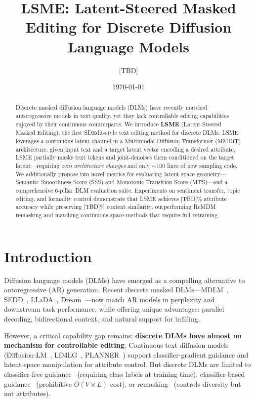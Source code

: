 \documentclass{article}
\title{LSME: Latent-Steered Masked Editing for Discrete Diffusion Language Models}
\author{[TBD]}
\date{\today}
\begin{document}
\maketitle

\begin{abstract}
Discrete masked diffusion language models (DLMs) have recently matched autoregressive models in text quality, yet they lack controllable editing capabilities enjoyed by their continuous counterparts.
We introduce \textbf{LSME} (Latent-Steered Masked Editing), the first SDEdit-style text editing method for discrete DLMs.
LSME leverages a continuous latent channel in a Multimodal Diffusion Transformer (MMDiT) architecture: given input text and a target latent vector encoding a desired attribute, LSME partially masks text tokens and joint-denoises them conditioned on the target latent---requiring \emph{zero architecture changes} and only $\sim$100 lines of new sampling code.
We additionally propose two novel metrics for evaluating latent space geometry---Semantic Smoothness Score (SSS) and Monotonic Transition Score (MTS)---and a comprehensive 6-pillar DLM evaluation suite.
Experiments on sentiment transfer, topic editing, and formality control demonstrate that LSME achieves [TBD]\% attribute accuracy while preserving [TBD]\% content similarity, outperforming ReMDM remasking and matching continuous-space methods that require full retraining.
\end{abstract}

\section{Introduction}

Diffusion language models (DLMs) have emerged as a compelling alternative to autoregressive (AR) generation.
Recent discrete masked DLMs---MDLM~\cite{mdlm2024}, SEDD~\cite{sedd2024}, LLaDA~\cite{llada2025}, Dream~\cite{dream2025}---now match AR models in perplexity and downstream task performance, while offering unique advantages: parallel decoding, bidirectional context, and natural support for infilling.

However, a critical capability gap remains: \textbf{discrete DLMs have almost no mechanism for controllable editing}.
Continuous text diffusion models (Diffusion-LM~\cite{diffusionlm2022}, LD4LG~\cite{ld4lg2023}, PLANNER~\cite{planner2023}) support classifier-gradient guidance and latent-space manipulation for attribute control.
But discrete DLMs are limited to classifier-free guidance~\cite{simpleguidance2025} (requiring class labels at training time), classifier-based guidance~\cite{simpleguidance2025} (prohibitive $O(V \times L)$ cost), or remasking~\cite{remdm2025} (controls diversity but not attributes).
\end{document}

